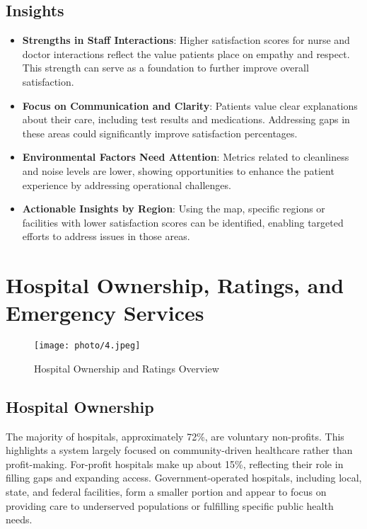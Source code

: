 \subsection{Insights}
\begin{itemize}
    \item \textbf{Strengths in Staff Interactions}: Higher satisfaction scores for nurse and doctor interactions reflect the value patients place on empathy and respect. This strength can serve as a foundation to further improve overall satisfaction.
    \item \textbf{Focus on Communication and Clarity}: Patients value clear explanations about their care, including test results and medications. Addressing gaps in these areas could significantly improve satisfaction percentages.
    \item \textbf{Environmental Factors Need Attention}: Metrics related to cleanliness and noise levels are lower, showing opportunities to enhance the patient experience by addressing operational challenges.
    \item \textbf{Actionable Insights by Region}: Using the map, specific regions or facilities with lower satisfaction scores can be identified, enabling targeted efforts to address issues in those areas.
\end{itemize}

\section{Hospital Ownership, Ratings, and Emergency Services}

\begin{figure}[ht]
    \centering
    \texttt{[image: photo/4.jpeg]} %
    \caption{Hospital Ownership and Ratings Overview}
    \label{fig:hospital_ownership_ratings}
\end{figure}

\subsection{Hospital Ownership}
The majority of hospitals, approximately 72\%, are voluntary non-profits. This highlights a system largely focused on community-driven healthcare rather than profit-making. For-profit hospitals make up about 15\%, reflecting their role in filling gaps and expanding access. Government-operated hospitals, including local, state, and federal facilities, form a smaller portion and appear to focus on providing care to underserved populations or fulfilling specific public health needs.

